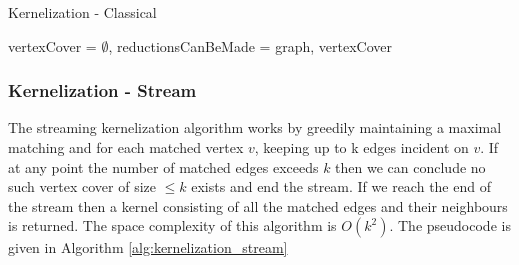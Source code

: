 \begin{algorithm}[htb]
    \caption{Kernelization - Classical}
    \label{alg:kernelization_classical}
    \DontPrintSemicolon



    vertexCover = $\emptyset$, reductionsCanBeMade = \KwTrue\;
    \Return graph, vertexCover\;
\end{algorithm}

\subsubsection{Kernelization - Stream}

The streaming kernelization algorithm works by greedily maintaining a maximal
matching and for each matched vertex \(v\), keeping up to k edges incident on
\(v\). If at any point the number of matched edges exceeds \(k\) then we can
conclude no such vertex cover of size \(\leq k\) exists and end the stream. If
we reach the end of the stream then a kernel consisting of all the matched
edges and their neighbours is returned. The space complexity of this algorithm
is \(O(k^2)\). The pseudocode is given in Algorithm
\ref{alg:kernelization_stream}

